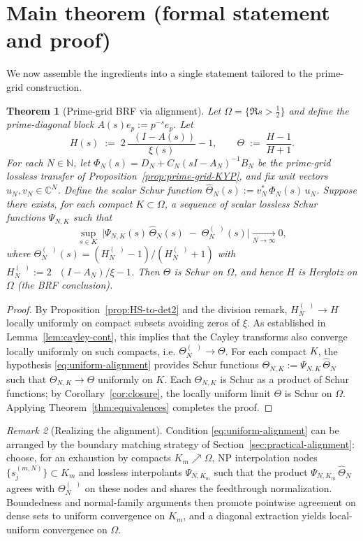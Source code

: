 \documentclass[11pt]{article}
\newtheorem{theorem}{Theorem}
\theoremstyle{definition}
\theoremstyle{remark}
\newtheorem{remark}[theorem]{Remark}
\newcommand{\C}{\mathbb{C}}
\newcommand{\N}{\mathbb{N}}
\DeclareMathOperator{\dettwo}{det_2}
\begin{document}
\section{Main theorem (formal statement and proof)}\label{sec:main-theorem}
We now assemble the ingredients into a single statement tailored to the prime-grid construction.

\begin{theorem}[Prime-grid BRF via alignment]\label{thm:prime-grid-BRF}
Let \(\Omega=\{\Re s>\tfrac12\}\) and define the prime-diagonal block \(A(s)e_p:=p^{-s}e_p\). Let
\[
 H(s)\;:=\;2\,\frac{\dettwo(I-A(s))}{\xi(s)}-1,\qquad \Theta\;:=\;\frac{H-1}{H+1}.
\]
For each \(N\in\N\), let \(\Phi_N(s)=D_N+C_N(sI-A_N)^{-1}B_N\) be the prime-grid lossless transfer of Proposition~\ref{prop:prime-grid-KYP}, and fix unit vectors \(u_N,v_N\in\C^N\). Define the scalar Schur function \(\widehat\Theta_N(s):=v_N^*\,\Phi_N(s)\,u_N\). Suppose there exists, for each compact \(K\subset\Omega\), a sequence of scalar lossless Schur functions \(\Psi_{N,K}\) such that
\begin{equation}\label{eq:uniform-alignment}
 \sup_{s\in K}\ \big|\Psi_{N,K}(s)\,\widehat\Theta_N(s)\; -\; \Theta_N^{(\dettwo)}(s)\big|\xrightarrow[N\to\infty]{}0,
\end{equation}
where \(\Theta_N^{(\dettwo)}(s)=(H_N^{(\dettwo)}-1)/(H_N^{(\dettwo)}+1)\) with \(H_N^{(\dettwo)}:=2\,\dettwo(I-A_N)/\xi-1\). Then \(\Theta\) is Schur on \(\Omega\), and hence \(H\) is Herglotz on \(\Omega\) (the BRF conclusion).
\end{theorem}
\begin{proof}
By Proposition~\ref{prop:HS-to-det2} and the division remark, \(H_N^{(\dettwo)}\to H\) locally uniformly on compact subsets avoiding zeros of \(\xi\). As established in Lemma~\ref{lem:cayley-cont}, this implies that the Cayley transforms also converge locally uniformly on such compacts, i.e. \(\Theta_N^{(\dettwo)}\to\Theta\). For each compact \(K\), the hypothesis \eqref{eq:uniform-alignment} provides Schur functions \(\Theta_{N,K}:=\Psi_{N,K}\,\widehat\Theta_N\) such that \(\Theta_{N,K}\to\Theta\) uniformly on \(K\). Each \(\Theta_{N,K}\) is Schur as a product of Schur functions; by Corollary~\ref{cor:closure}, the locally uniform limit \(\Theta\) is Schur on \(\Omega\). Applying Theorem~\ref{thm:equivalences} completes the proof.
\end{proof}
\begin{remark}[Realizing the alignment]
Condition \eqref{eq:uniform-alignment} can be arranged by the boundary matching strategy of Section~\ref{sec:practical-alignment}: choose, for an exhaustion by compacts \(K_m\nearrow\Omega\), NP interpolation nodes \(\{s_{j}^{(m,N)}\}\subset K_m\) and lossless interpolants \(\Psi_{N,K_m}\) such that the product \(\Psi_{N,K_m}\,\widehat\Theta_N\) agrees with \(\Theta_N^{(\dettwo)}\) on these nodes and shares the feedthrough normalization. Boundedness and normal-family arguments then promote pointwise agreement on dense sets to uniform convergence on \(K_m\), and a diagonal extraction yields local-uniform convergence on \(\Omega\).
\end{remark}
\end{document}
